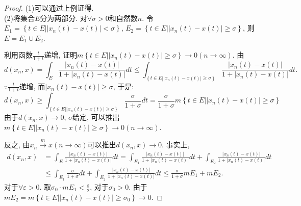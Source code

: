 \documentclass[lang=cn,10pt]{gorgeousnbook}
\numberwithin{equation}{section}%
\numberwithin{figure}{section}%
\begin{document}
\begin{proof}
(1)可以通过上例证得. \\
(2)将集合$E$分为两部分. 对$\forall \sigma >0$和自然数$n$. 令$E_1=\left\{ t\in E\left| \left| x_n\left( t \right) -x\left( t \right) \right|<\sigma \right. \right\} $, $E_2=\left\{ t\in E\left| \left| x_n\left( t \right) -x\left( t \right) \right|\ge\sigma \right. \right\} $, 则$E=E_1\cup E_2$.

利用函数$\frac{t}{1+t}$递增, 证明$m\left\{ t\in E\left| \left| x_n\left( t \right) -x\left( t \right) \right|\ge \sigma \right. \right\} \rightarrow 0\left( n\rightarrow \infty \right) $. 由
\begin{equation}
d(x_n,x)=\int_E{\frac{\left| x_n\left( t \right) -x\left( t \right) \right|}{1+\left| x_n\left( t \right) -x\left( t \right) \right|}}dt\le \int_{\left\{ t\in E\left| \left| x_n\left( t \right) -x\left( t \right) \right|\ge \sigma \right. \right\}}{\frac{\left| x_n\left( t \right) -x\left( t \right) \right|}{1+\left| x_n\left( t \right) -x\left( t \right) \right|}}dt. \nonumber
\end{equation}
$\because \frac{t}{1+t}$递增, 而$\left| x_n\left( t \right) -x\left( t \right) \right|\ge \sigma $, 于是:
\begin{equation}
d\left( x_n,x \right) \ge \int_{\left\{ t\in E\left| \left| x_n\left( t \right) -x\left( t \right) \right|\ge \sigma \right. \right\}}{\frac{\sigma}{1+\sigma}}dt=\frac{\sigma}{1+\sigma}m\left\{ t\in E\left| \left| x_n\left( t \right) -x\left( t \right) \right|\ge \sigma \right. \right\}  \nonumber
\end{equation}
由于$d(x_n,x)\rightarrow  0 $, $\sigma$给定, 可以推出$m\left\{ t\in E\left| \left| x_n\left( t \right) -x\left( t \right) \right|\ge \sigma \right. \right\} \rightarrow 0\left( n\rightarrow \infty \right) $.

反之, 由$x_n\xrightarrow{m}x\left( n\rightarrow \infty \right) $可以推出$d(x_n,x)\rightarrow 0$. 事实上, 
\begin{equation}
\begin{aligned}
d\left( x_n,x \right) &=\int_E{\frac{\left| x_n\left( t \right) -x\left( t \right) \right|}{1+\left| x_n\left( t \right) -x\left( t \right) \right|}}dt=\int_{E_1}{\frac{\left| x_n\left( t \right) -x\left( t \right) \right|}{1+\left| x_n\left( t \right) -x\left( t \right) \right|}}dt+\int_{E_2}{\frac{\left| x_n\left( t \right) -x\left( t \right) \right|}{1+\left| x_n\left( t \right) -x\left( t \right) \right|}}dt \\
&\le \int_{E_1}{\frac{\sigma}{1+\sigma}}dt+\int_{E_2}{\frac{\left| x_n\left( t \right) -x\left( t \right) \right|}{1+\left| x_n\left( t \right) -x\left( t \right) \right|}}dt\le \frac{\sigma}{1+\sigma}mE_1+mE_2. \nonumber
\end{aligned}
\end{equation}
对于$\forall\varepsilon >0$. 取$\sigma _0\cdot mE_1<\frac{\varepsilon}{2}$, 对于$\sigma _0>0$. 由于$mE_2=m\left\{ t\in E\left| \left| x_n\left( t \right) -x\left( t \right) \right|\ge \sigma _0 \right. \right\} \rightarrow 0$. 


\end{proof}
\end{document}
